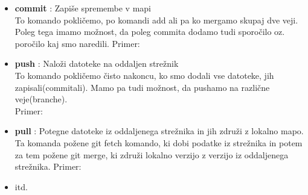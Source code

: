 \begin{itemize}
	\item \textbf{commit} : Zapiše spremembe v mapi\\
	To komando pokličemo, po komandi add ali pa ko mergamo skupaj dve veji. Poleg tega imamo možnost, da poleg commita dodamo tudi sporočilo oz. poročilo kaj smo naredili. Primer:\\
	\item \textbf{push} : Naloži datoteke na oddaljen strežnik\\
	To komando pokličemo čisto nakoncu, ko smo dodali vse datoteke, jih zapisali(commitali). Mamo pa tudi možnost, da pushamo na različne veje(branche).\\
	Primer:\\
	\item \textbf{pull} : Potegne datoteke iz oddaljenega strežnika in jih združi z lokalno mapo.\\
	Ta komanda požene git fetch komando, ki dobi podatke iz strežnika in potem za tem požene git merge, ki združi lokalno verzijo z verzijo iz oddaljenega strežnika.
	Primer:\\
	\item itd.
\end{itemize}


